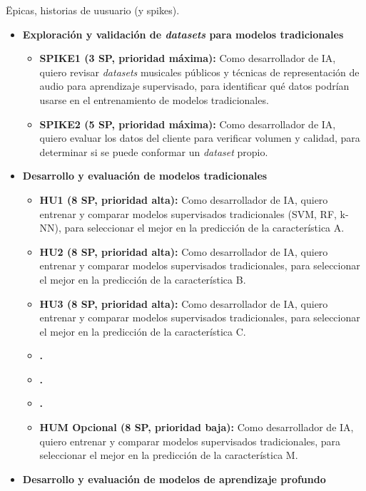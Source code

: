\documentclass[
11pt, %
]{charter}
\begin{document}
Ëpicas, historias de uusuario (y spikes).

\begin{itemize}
  \item \textbf{Exploración y validación de \textit{datasets} para modelos tradicionales}
    \begin{itemize}
      \item \textbf{SPIKE1 (3 SP, prioridad máxima):}
      Como desarrollador de IA, quiero revisar \textit{datasets} musicales públicos y técnicas de representación de audio para aprendizaje supervisado, para identificar qué datos podrían usarse en el entrenamiento de modelos tradicionales.
      \item \textbf{SPIKE2 (5 SP, prioridad máxima):}
      Como desarrollador de IA, quiero evaluar los datos del cliente para verificar volumen y calidad, para determinar si se puede conformar un \textit{dataset} propio.
    \end{itemize}
  \item \textbf{Desarrollo y evaluación de modelos tradicionales}
    \begin{itemize}
      \item \textbf{HU1 (8 SP, prioridad alta):}
      Como desarrollador de IA, quiero entrenar y comparar modelos supervisados tradicionales (SVM, RF, k-NN), para seleccionar el mejor en la predicción de la característica A.
      \item \textbf{HU2 (8 SP, prioridad alta):}
      Como desarrollador de IA, quiero entrenar y comparar modelos supervisados tradicionales, para seleccionar el mejor en la predicción de la característica B.
      \item \textbf{HU3 (8 SP, prioridad alta):}
      Como desarrollador de IA, quiero entrenar y comparar modelos supervisados tradicionales, para seleccionar el mejor en la predicción de la característica C.
      \item \textbf{.}
      \item \textbf{.}
      \item \textbf{.}
      \item \textbf{HUM Opcional (8 SP, prioridad baja):}
      Como desarrollador de IA, quiero entrenar y comparar modelos supervisados tradicionales, para seleccionar el mejor en la predicción de la característica M.
    \end{itemize}
  \item \textbf{Desarrollo y evaluación de modelos de aprendizaje profundo}
    \begin{itemize}

\end{itemize}
\end{itemize}
\end{document}

